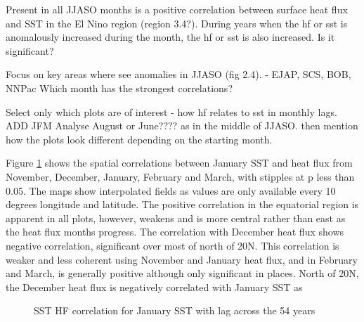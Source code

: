 Present in all JJASO months is a positive correlation between surface heat flux and SST in the El Nino region (region 3.4?). During years when the hf or sst is anomalously increased during the month, the hf or sst is also increased. Is it significant?

Focus on key areas where see anomalies in JJASO (fig 2.4). - EJAP, SCS, BOB, NNPac
Which month has the strongest correlations?

Select only which plots are of interest - how hf relates to sst in monthly lags.
ADD JFM
Analyse August or June???? as in the middle of JJASO. then mention how the plots look different depending on the starting month.

Figure \ref{fig:corr_sstJan_hflag} shows the spatial correlations between January SST and heat flux from November, December, January, February and March, with stipples at p less than 0.05. The maps show interpolated fields as values are only available every 10 degrees longitude and latitude. The positive correlation in the equatorial region is apparent in all plots, however, weakens and is more central rather than east as the heat flux months progress. The correlation with December heat flux shows negative correlation, significant over most of north of 20N. This correlation is weaker and less coherent using November and January heat flux, and in February and March, is generally positive although only significant in places. North of 20N, the December heat flux is negatively correlated with January SST as  

\begin{figure}
	\centering
	
	\caption{SST HF correlation for January SST with lag across the 54 years} \label{fig:corr_sstJan_hflag} 
\end{figure} 


